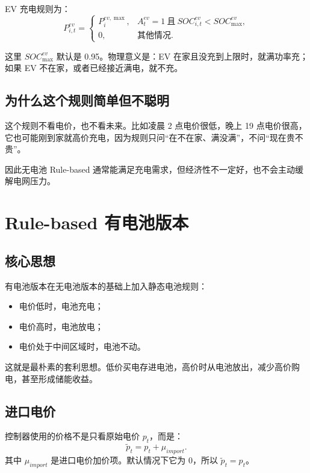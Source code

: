 \documentclass[UTF8,zihao=-4]{ctexart}
\begin{document}
EV 充电规则为：
\begin{equation}
P^{ev}_{i,t}=
\begin{cases}
P^{ev,\max}_i, & A^{ev}_t=1\ \text{且}\ SOC^{ev}_{i,t}<SOC^{ev}_{\max},\\
0, & \text{其他情况}.
\end{cases}
\end{equation}

这里 $SOC^{ev}_{\max}$ 默认是 0.95。物理意义是：EV 在家且没充到上限时，就满功率充；如果 EV 不在家，或者已经接近满电，就不充。

\subsection{为什么这个规则简单但不聪明}

这个规则不看电价，也不看未来。比如凌晨 2 点电价很低，晚上 19 点电价很高，它也可能刚到家就高价充电，因为规则只问“在不在家、满没满”，不问“现在贵不贵”。

因此无电池 Rule-based 通常能满足充电需求，但经济性不一定好，也不会主动缓解电网压力。

\section{Rule-based 有电池版本}

\subsection{核心思想}

有电池版本在无电池版本的基础上加入静态电池规则：

\begin{itemize}
  \item 电价低时，电池充电；
  \item 电价高时，电池放电；
  \item 电价处于中间区域时，电池不动。
\end{itemize}

这就是最朴素的套利思想。低价买电存进电池，高价时从电池放出，减少高价购电，甚至形成储能收益。

\subsection{进口电价}

控制器使用的价格不是只看原始电价 $p_t$，而是：
\begin{equation}
\tilde p_t=p_t+\mu_{import}.
\end{equation}
其中 $\mu_{import}$ 是进口电价加价项。默认情况下它为 0，所以 $\tilde p_t=p_t$。
\end{document}
